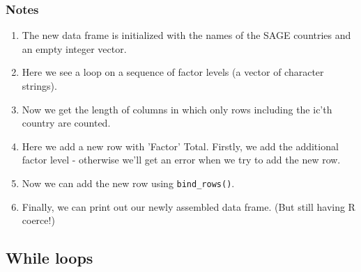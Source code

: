 \documentclass[titlepage]{book}\usepackage{knitr}
\begin{document}
\subsubsection{Notes}
\begin{enumerate}
\item{The new data frame is initialized with the names of the SAGE countries and an empty integer vector.}
\item{Here we see a loop on a sequence of factor levels (a vector of character strings).}
\item{Now we get the length of columns in which only rows including the ic'th country are counted.}
\item{Here we add a new row with 'Factor' Total. Firstly, we add the additional factor level - otherwise we'll get an error when we try to add the new row.}
\item{Now we can add the new row using \texttt{bind\_rows()}.}
\item{Finally,  we can print out our newly assembled data frame. (But still having R coerce!)}
\end{enumerate}

\subsection{While loops}
\end{document}
